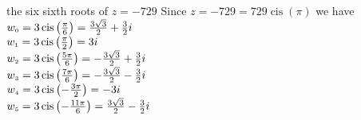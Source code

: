 { the six sixth roots of $z = -729$ \label{polarrootslast}}
{ Since $z = -729 = 729 \operatorname{cis}(\pi)$ we have \\$w_{\text{\tiny$0$}} = 3\operatorname{cis}\left(\frac{\pi}{6}\right) = \frac{3\sqrt{3}}{2} + \frac{3}{2}i$\\$w_{\text{\tiny$1$}} = 3\operatorname{cis}\left(\frac{\pi}{2}\right) = 3i$\\$w_{\text{\tiny$2$}} = 3\operatorname{cis}\left(\frac{5\pi}{6}\right) = -\frac{3\sqrt{3}}{2} + \frac{3}{2}i$\\$w_{\text{\tiny$3$}} = 3\operatorname{cis}\left(\frac{7\pi}{6}\right) =  -\frac{3\sqrt{3}}{2}-\frac{3}{2}i$\\$w_{\text{\tiny$4$}} = 3\operatorname{cis}\left(-\frac{3\pi}{2}\right) = -3i$\\$w_{\text{\tiny$5$}} = 3\operatorname{cis}\left(-\frac{11\pi}{6}\right) = \frac{3\sqrt{3}}{2} - \frac{3}{2}i$}
